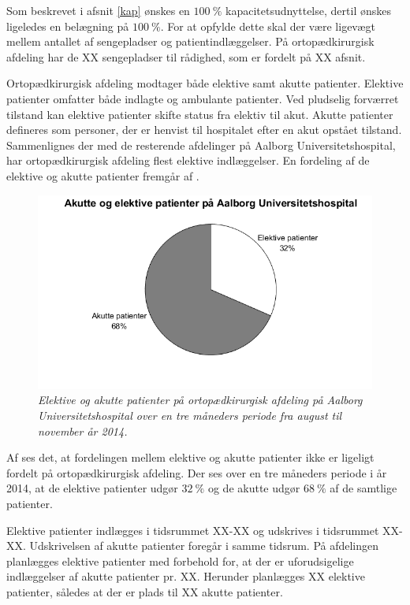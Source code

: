 Som beskrevet i afsnit \ref{kap} ønskes en $100~\%$ kapacitetsudnyttelse, dertil ønskes ligeledes en belægning på $100~\%$. 
For at opfylde dette skal der være ligevægt mellem antallet af sengepladser og patientindlæggelser. På ortopædkirurgisk afdeling har de XX sengepladser til rådighed, som er fordelt på XX afsnit.

Ortopædkirurgisk afdeling modtager både elektive samt akutte patienter. Elektive patienter omfatter både indlagte og ambulante patienter. Ved pludselig forværret tilstand kan elektive patienter skifte status fra elektiv til akut. Akutte patienter defineres som personer, der er henvist til hospitalet efter en akut opstået tilstand. Sammenlignes der med de resterende afdelinger på Aalborg Universitetshospital, har ortopædkirurgisk afdeling flest elektive indlæggelser.\cite{RegionNord2016} En fordeling af de elektive og akutte patienter fremgår af .

\begin{figure}[H]
	\flushleft 
	\centering
	\includegraphics[scale=0.45]{figures/elektivvsakut.png}
	\flushleft
	\caption{\textit{Elektive og akutte patienter på ortopædkirurgisk afdeling på Aalborg Universitetshospital over en tre måneders periode fra august til november år 2014.}}
	\end{figure}

Af  ses det, at fordelingen mellem elektive og akutte patienter ikke er ligeligt fordelt på ortopædkirurgisk afdeling. Der ses over en tre måneders periode i år 2014, at de elektive patienter udgør $32~\%$ og de akutte udgør $68~\%$ af de samtlige patienter. 

Elektive patienter indlægges i tidsrummet XX-XX og udskrives i tidsrummet XX-XX. Udskrivelsen af akutte patienter foregår i samme tidsrum. På afdelingen planlægges elektive patienter med forbehold for, at der er uforudsigelige indlæggelser af akutte patienter pr. XX. Herunder planlægges XX elektive patienter, således at der er plads til XX akutte patienter.